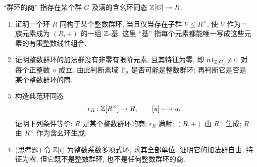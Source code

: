 \documentclass{article}
\begin{document}
\begin{problem}
``群环的商'' 指存在某个群 $G$ 及满的含幺环同态 $\mathbb{Z}[G]\twoheadrightarrow R$.
\begin{enumerate}
  \item[(a)] 证明一个环 $R$ 同构于某个整数群环, 当且仅当存在子群 $V\le R^\times$, 使 $V$ 作为一族元素成为 $(R,+)$ 的一组 $\mathbb{Z}$-基. 这里 ``基'' 指每个元素都能唯一写成这些元素的有限整数线性组合.
  \item[(b)] 证明整数群环的加法群没有非零有限阶元素, 且其特征为零, 即 $n1_{\mathbb{Z}[G]}\ne0$ 对每个正整数 $n$ 成立. 由此判断素域 $\mathbb{F}_p$ 是否可能是整数群环; 再判断它是否是某个整数群环的商.
  \item[(c)] 构造典范环同态
  \[
    \epsilon_R:\mathbb{Z}[R^\times]\to R,\qquad [u]\longmapsto u.
  \]
  证明下列条件等价: $R$ 是某个整数群环的商; $\epsilon_R$ 满射; $(R,+)$ 由 $R^\times$ 生成; $R$ 由 $R^\times$ 作为含幺环生成.
  \item[(d)] ({\heiti 思考题}) 令 $\mathbb{Z}[t]$ 为整数系数多项式环, 求其全部单位. 证明它的加法群自由, 特征为零, 但它既不是整数群环, 也不是任何整数群环的商.
\end{enumerate}
\end{problem}
\end{document}
